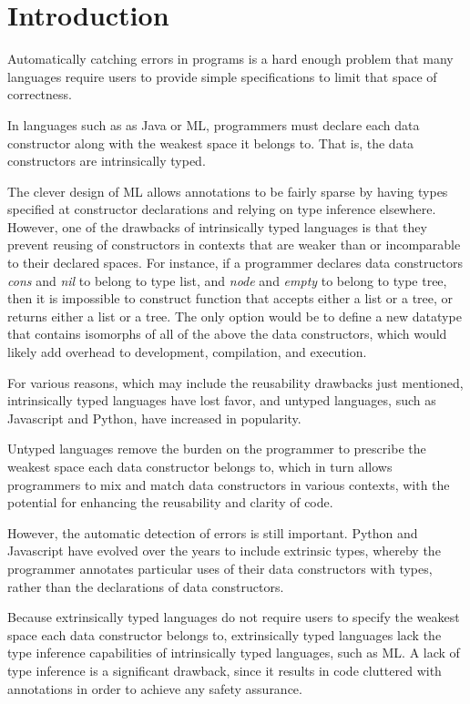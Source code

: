 \documentclass[acmsmall]{acmart}
\theoremstyle{definition}
\begin{document}
\section{Introduction}
\label{sec:introduction}

Automatically catching errors in programs is a hard enough problem
that many languages require users to provide simple specifications to limit that space of correctness.

In languages such as as Java or ML, programmers must declare each data constructor along with the weakest space it belongs to. 
That is, the data constructors are intrinsically typed.

The clever design of ML allows annotations to be fairly sparse by 
having types specified at constructor declarations and relying on type inference elsewhere.
However, one of the drawbacks of intrinsically typed languages is that they prevent reusing of
constructors in contexts that are weaker than or incomparable to their declared spaces. 
For instance, if a programmer declares data constructors \emph{cons} and \emph{nil} to belong to type list,
and \emph{node} and \emph{empty} to belong to type tree, then it is impossible to construct function
that accepts either a list or a tree, or returns either a list or a tree. The only option would be to define
a new datatype that contains isomorphs of all of the above the data constructors, which would 
likely add overhead to development, compilation, and execution.


For various reasons, which may include the reusability drawbacks just mentioned, 
intrinsically typed languages have lost favor,
and untyped languages, 
such as Javascript and Python, have increased in popularity. 

Untyped languages remove the burden on the programmer to prescribe the weakest space each data constructor belongs to, 
which in turn allows programmers to mix and match data constructors in
various contexts, with the potential for enhancing the reusability and clarity of code.

However, the automatic detection of errors is still important. Python and Javascript have 
evolved over the years to include extrinsic types, whereby the programmer annotates particular uses of
their data constructors with types, rather than the declarations of data constructors.
 
Because extrinsically typed languages do not require users to specify the weakest space each data constructor belongs to,
extrinsically typed languages lack the type inference capabilities of intrinsically typed languages, such as ML. 
A lack of type inference is a significant drawback, since it results in code cluttered with annotations in order
to achieve any safety assurance.
\end{document}
